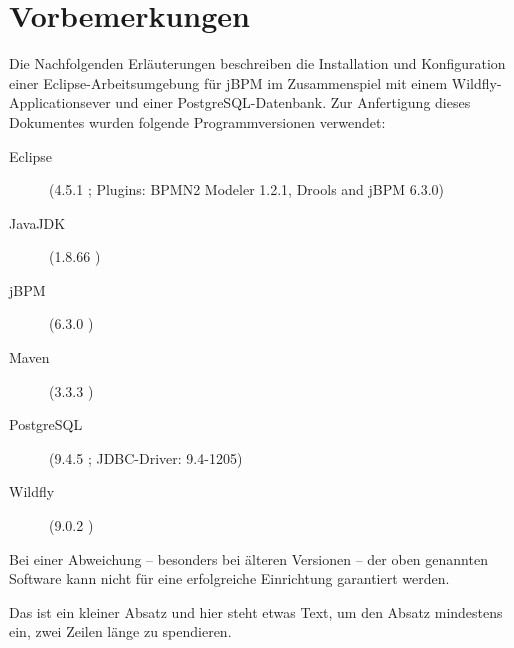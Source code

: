 \section{Vorbemerkungen}
Die Nachfolgenden Erläuterungen beschreiben die Installation und Konfiguration einer Eclipse-Arbeitsumgebung für jBPM im Zusammenspiel mit einem Wildfly-Applicationsever und einer PostgreSQL-Datenbank. Zur Anfertigung dieses Dokumentes wurden folgende Programmversionen verwendet:
\begin{description}
	\item[Eclipse] (4.5.1 ; Plugins: BPMN2 Modeler 1.2.1, Drools and jBPM 6.3.0)
	\item[JavaJDK] (1.8.66 ) 
	\item[jBPM] (6.3.0 )
	\item[Maven] (3.3.3 )
	\item[PostgreSQL] (9.4.5 ; JDBC-Driver: 9.4-1205)
	\item[Wildfly] (9.0.2 )
\end{description}
Bei einer Abweichung -- besonders bei älteren Versionen -- der oben genannten Software kann nicht für eine erfolgreiche Einrichtung garantiert werden.

Das ist ein kleiner Absatz und hier steht etwas Text, um den Absatz mindestens ein, zwei Zeilen länge zu spendieren.

